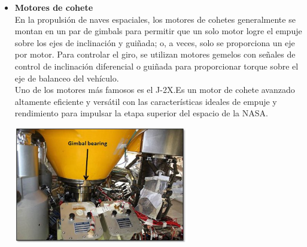 \begin{itemize}
    \item \textbf{Motores de cohete}\\
    En la propulsión de naves espaciales, los motores de cohetes generalmente se 
    montan en un par de gimbals para permitir que un solo motor logre el empuje 
    sobre los ejes de inclinación y guiñada; o, a veces, solo se proporciona un eje 
    por motor. Para controlar el giro, se utilizan motores gemelos con señales de 
    control de inclinación diferencial o guiñada para proporcionar torque sobre el 
    eje de balanceo del vehículo.\\
    Uno de los motores más famosos es el J-2X.Es un motor de cohete avanzado altamente 
    eficiente y versátil con las características ideales de empuje y rendimiento para 
    impulsar la etapa superior del espacio de la NASA.~\cite{NASA}
    \begin{center}
        \includegraphics[width=0.6\textwidth]{Capitulo1/Fig2.eps}       
        \label{Fig2}
    \end{center}


\end{itemize}
